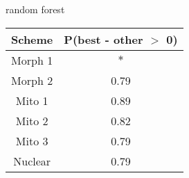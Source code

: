 \begin{subtable}[b]{0.3\linewidth}
  \caption{random forest}
  \centering
  \begin{tabular}{ c c }
    \hline
    Scheme & P(best - other \(>\) 0) \\ 
    \hline
    \hline
    Morph 1 & \(\ast\) \\ 
    Morph 2 & 0.79 \\
    Mito 1 & 0.89 \\ 
    Mito 2 & 0.82 \\ 
    Mito 3 & 0.79 \\ 
    Nuclear & 0.79 \\ 
    \hline
  \end{tabular}
  \label{rfdif}
\end{subtable}
